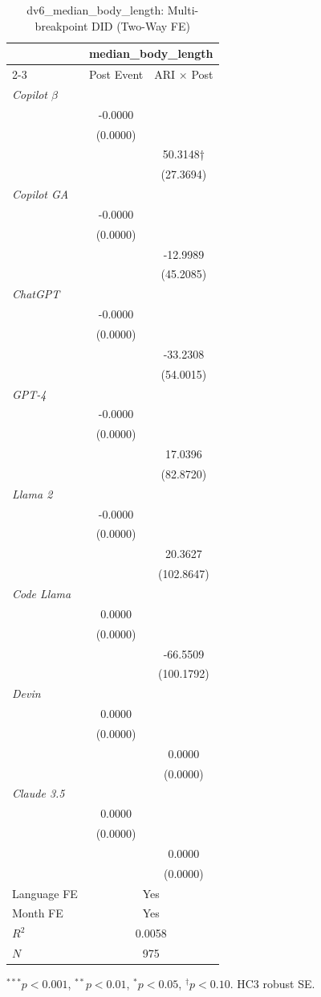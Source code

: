 \begin{table}[htbp]\centering
\caption{dv6_median_body_length: Multi-breakpoint DID (Two-Way FE)}
\begin{tabular}{lcc}
\toprule
 & \multicolumn{2}{c}{median_body_length} \\
\cmidrule(l){2-3}
 & Post Event & ARI $\times$ Post \\
\midrule
\textit{Copilot $\beta$} & & \\
 & -0.0000 & \\
 & (0.0000) & \\
 &  & 50.3148† \\
 &  & (27.3694) \\
\textit{Copilot GA} & & \\
 & -0.0000 & \\
 & (0.0000) & \\
 &  & -12.9989 \\
 &  & (45.2085) \\
\textit{ChatGPT} & & \\
 & -0.0000 & \\
 & (0.0000) & \\
 &  & -33.2308 \\
 &  & (54.0015) \\
\textit{GPT-4} & & \\
 & -0.0000 & \\
 & (0.0000) & \\
 &  & 17.0396 \\
 &  & (82.8720) \\
\textit{Llama 2} & & \\
 & -0.0000 & \\
 & (0.0000) & \\
 &  & 20.3627 \\
 &  & (102.8647) \\
\textit{Code Llama} & & \\
 & 0.0000 & \\
 & (0.0000) & \\
 &  & -66.5509 \\
 &  & (100.1792) \\
\textit{Devin} & & \\
 & 0.0000 & \\
 & (0.0000) & \\
 &  & 0.0000 \\
 &  & (0.0000) \\
\textit{Claude 3.5} & & \\
 & 0.0000 & \\
 & (0.0000) & \\
 &  & 0.0000 \\
 &  & (0.0000) \\
\midrule
Language FE & \multicolumn{2}{c}{Yes} \\
Month FE    & \multicolumn{2}{c}{Yes} \\
$R^2$ & \multicolumn{2}{c}{0.0058} \\
$N$   & \multicolumn{2}{c}{975} \\
\bottomrule
\end{tabular}
{\footnotesize $^{***}p<0.001$, $^{**}p<0.01$, $^{*}p<0.05$, $^{\dagger}p<0.10$. HC3 robust SE.}
\end{table}